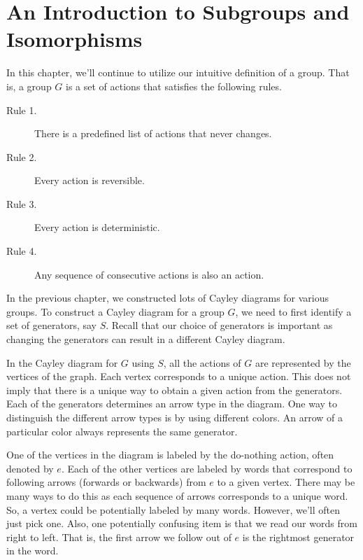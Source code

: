 \chapter{An Introduction to Subgroups and Isomorphisms}
\label{chapter:intro_subgroups_isomorphisms}
\thispagestyle{empty}

In this chapter, we'll continue to utilize our intuitive definition of a group.  That is, a group $G$ is a set of actions that satisfies the following rules.

\begin{description}
\item[Rule 1.] There is a predefined list of actions that never changes.
\item[Rule 2.] Every action is reversible.
\item[Rule 3.] Every action is deterministic.
\item[Rule 4.] Any sequence of consecutive actions is also an action.
\end{description}

In the previous chapter, we constructed lots of Cayley diagrams for various groups.  To construct a Cayley diagram for a group $G$, we need to first identify a set of generators, say $S$.  Recall that our choice of generators is important as changing the generators can result in a different Cayley diagram.  

In the Cayley diagram for $G$ using $S$, all the actions of $G$ are represented by the vertices of the graph.  Each vertex corresponds to a unique action.  This does not imply that there is a unique way to obtain a given action from the generators.  Each of the generators determines an arrow type in the diagram.  One way to distinguish the different arrow types is by using different colors.  An arrow of a particular color always represents the same generator.

One of the vertices in the diagram is labeled by the do-nothing action, often denoted by $e$.  Each of the other vertices are labeled by words that correspond to following arrows (forwards or backwards) from $e$ to a given vertex.  There may be many ways to do this as each sequence of arrows corresponds to a unique word.  So, a vertex could be potentially labeled by many words.  However, we'll often just pick one.  Also, one potentially confusing item is that we read our words from right to left.  That is, the first arrow we follow out of $e$ is the rightmost generator in the word.

